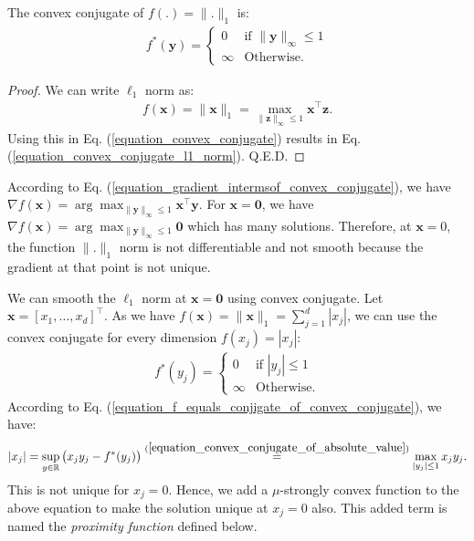 \documentclass[lang=cn,10pt]{gorgeousnbook}
\numberwithin{equation}{section}%
\numberwithin{figure}{section}%
\begin{document}
\begin{lemma}
The convex conjugate of $f(.) = \|.\|_1$ is:
\begin{align}\label{equation_convex_conjugate_l1_norm}
f^*(\boldsymbol{y}) = 
\left\{
    \begin{array}{ll}
        0 & \mbox{if } \|\boldsymbol{y}\|_{\infty} \leq 1 \\
        \infty & \mbox{Otherwise.}
    \end{array}
\right.
\end{align}
\end{lemma}
\begin{proof}
We can write $\ell_1$ norm as:
\begin{align*}
f(\boldsymbol{x}) = \|\boldsymbol{x}\|_1 = \max_{\|\boldsymbol{z}\|_\infty \leq 1} \boldsymbol{x}^\top \boldsymbol{z}.
\end{align*}
Using this in Eq. (\ref{equation_convex_conjugate}) results in Eq. (\ref{equation_convex_conjugate_l1_norm}). Q.E.D.
\end{proof}

According to Eq. (\ref{equation_gradient_intermsof_convex_conjugate}), we have $\nabla f(\boldsymbol{x}) = \arg\max_{\|\boldsymbol{y}\|_\infty \leq 1} \boldsymbol{x}^\top \boldsymbol{y}$. 
For $\boldsymbol{x} = \boldsymbol{0}$, we have $\nabla f(\boldsymbol{x}) = \arg\max_{\|\boldsymbol{y}\|_\infty \leq 1} \boldsymbol{0}$ which has many solutions. Therefore, at $\boldsymbol{x} = 0$, the function $\|.\|_1$ norm is not differentiable and not smooth because the gradient at that point is not unique. 

We can smooth the $\ell_1$ norm at $\boldsymbol{x}=\boldsymbol{0}$ using convex conjugate. Let $\boldsymbol{x} = [x_1, \dots, x_d]^\top$. As we have $f(\boldsymbol{x}) = \|\boldsymbol{x}\|_1 = \sum_{j=1}^d |x_j|$, we can use the convex conjugate for every dimension $f(x_j) = |x_j|$:
\begin{align}\label{equation_convex_conjugate_of_absolute_value}
f^*(y_j) = 
\left\{
    \begin{array}{ll}
        0 & \mbox{if } |y_j| \leq 1 \\
        \infty & \mbox{Otherwise.}
    \end{array}
\right.
\end{align}
According to Eq. (\ref{equation_f_equals_conjigate_of_convex_conjugate}), we have:
\begin{align*}
|x_j| = \sup_{y \in \mathbb{R}} \big( x_j y_j - f^*(y_j) \big) \overset{(\ref{equation_convex_conjugate_of_absolute_value})}{=} \max_{|y_j| \leq 1} x_j y_j.
\end{align*}
This is not unique for $x_j = 0$. Hence, we add a $\mu$-strongly convex function to the above equation to make the solution unique at $x_j=0$ also.
This added term is named the \textit{proximity function} defined below.
\end{document}
